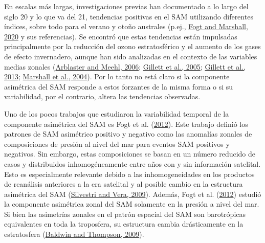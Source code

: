\documentclass[12pt,oneside,a4paper]{reedthesis}
\begin{document}
En escalas más largas, investigaciones previas han documentado a lo largo del siglo 20 y lo que va del 21, tendencias positivas en el SAM utilizando diferentes índices, sobre todo para el verano y otoño australes (p.ej., \protect\hyperlink{ref-fogt2020}{Fogt and Marshall, 2020} y sus referencias).
Se encontró que estas tendencias están impulsadas principalmente por la reducción del ozono estratosférico y el aumento de los gases de efecto invernadero, aunque han sido analizadas en el contexto de las variables medias zonales (\protect\hyperlink{ref-arblaster2006}{Arblaster and Meehl, 2006}; \protect\hyperlink{ref-gillett2005}{Gillett et al., 2005}; \protect\hyperlink{ref-gillett2013}{Gillett et al., 2013}; \protect\hyperlink{ref-marshall2004}{Marshall et al., 2004}).
Por lo tanto no está claro si la componente asimétrica del SAM responde a estos forzantes de la misma forma o si su variabilidad, por el contrario, altera las tendencias observadas.

Uno de los pocos trabajos que estudiaron la variabilidad temporal de la componente asimétrica del SAM es Fogt et al. (\protect\hyperlink{ref-fogt2012}{2012}).
Este trabajo definió los patrones de SAM asimétrico positivo y negativo como las anomalías zonales de composiciones de presión al nivel del mar para eventos SAM positivos y negativos.
Sin embargo, estas composiciones se basan en un número reducido de casos y distribuidos inhomogéneamente entre años con y sin información satelital.
Esto es especialmente relevante debido a las inhomogeneidades en los productos de reanálisis anteriores a la era satelital y al posible cambio en la estructura asimétrica del SAM (\protect\hyperlink{ref-silvestri2009}{Silvestri and Vera, 2009}).
Además, Fogt et al. (\protect\hyperlink{ref-fogt2012}{2012}) estudió la componente asimétrica zonal del SAM solamente en la presión a nivel del mar.
Si bien las asimetrías zonales en el patrón espacial del SAM son barotrópicas equivalentes en toda la troposfera, su estructura cambia drásticamente en la estratosfera (\protect\hyperlink{ref-baldwin2009}{Baldwin and Thompson, 2009}).
\end{document}

